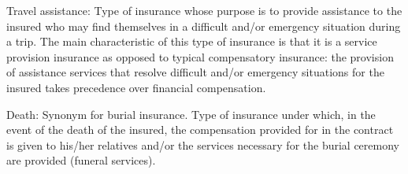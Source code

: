 \documentclass[review]{elsarticle}
\begin{document}
Travel assistance: Type of insurance whose purpose is to provide assistance to the insured who may find themselves in a difficult and/or emergency situation during a trip. The main characteristic of this type of insurance is that it is a service provision insurance as opposed to typical compensatory insurance: the provision of assistance services that resolve difficult and/or emergency situations for the insured takes precedence over financial compensation.

Death: Synonym for burial insurance. Type of insurance under which, in the event of the death of the insured, the compensation provided for in the contract is given to his/her relatives and/or the services necessary for the burial ceremony are provided (funeral services).
\end{document}
